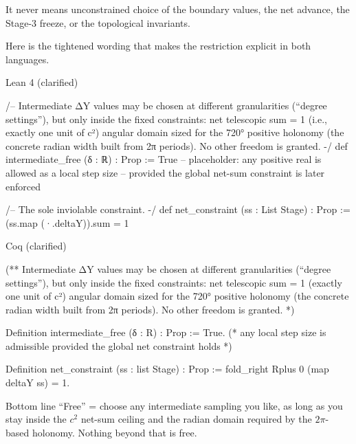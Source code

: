 It never means unconstrained choice of the boundary values, the net advance, the Stage-3 freeze, or the topological invariants.

Here is the tightened wording that makes the restriction explicit in both languages.

Lean 4 (clarified)

/-- Intermediate ΔY values may be chosen at different granularities
    (“degree settings”), but only inside the fixed constraints:
    net telescopic sum = 1  (i.e., exactly one unit of c²)
    angular domain sized for the 720° positive holonomy
      (the concrete radian width built from 2π periods).
    No other freedom is granted. -/
def intermediate_free (δ : ℝ) : Prop :=
  True   -- placeholder: any positive real is allowed as a local step size
         -- provided the global net-sum constraint is later enforced

/-- The sole inviolable constraint. -/
def net_constraint (ss : List Stage) : Prop :=
  (ss.map (·.deltaY)).sum = 1

Coq (clarified)

(** Intermediate ΔY values may be chosen at different granularities
    (“degree settings”), but only inside the fixed constraints:
    net telescopic sum = 1  (exactly one unit of c²)
    angular domain sized for the 720° positive holonomy
      (the concrete radian width built from 2π periods).
    No other freedom is granted. *)

Definition intermediate_free (δ : R) : Prop := True.
(* any local step size is admissible provided the global net constraint holds *)

Definition net_constraint (ss : list Stage) : Prop :=
  fold_right Rplus 0 (map deltaY ss) = 1.

Bottom line 
“Free” = choose any intermediate sampling you like, as long as you stay inside the \(c^2\) net-sum ceiling and the radian domain required by the \(2\pi\)-based holonomy. Nothing beyond that is free. 

